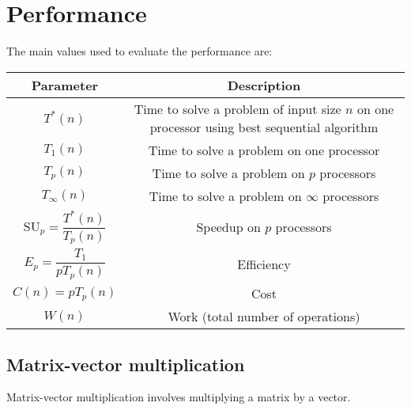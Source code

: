 \section{Performance}

The main values used to evaluate the performance are: 
\renewcommand*{\arraystretch}{2}
\begin{table}[H]
    \centering
    \begin{tabular}{|c|c|}
    \hline
    \textbf{Parameter} & \textbf{Description} \\ \hline
    $T^\ast(n)$ & \makecell{Time to solve a problem of input size $n$ on one processor \\ using best sequential algorithm}               \\ \hline
    $T_1(n)$ & Time to solve a problem on one processor                  \\ \hline
    $T_p(n)$ & Time to solve a problem on $p$ processors                    \\ \hline
    $T_{\infty}(n)$ & Time to solve a problem on $\infty$ processors        \\ \hline
    $\text{SU}_p = \dfrac{T^\ast(n)}{T_p(n)}$ & Speedup on $p$ processors    \\ \hline
    $E_p = \dfrac{T_1}{p T_p(n)}$ & Efficiency                               \\ \hline
    $C(n) = p T_p(n)$ & Cost                                               \\ \hline
    $W(n)$ & Work (total number of operations)                               \\ \hline
    \end{tabular}
\end{table}
\renewcommand*{\arraystretch}{1}

\subsection{Matrix-vector multiplication}
Matrix-vector multiplication involves multiplying a matrix by a vector.

